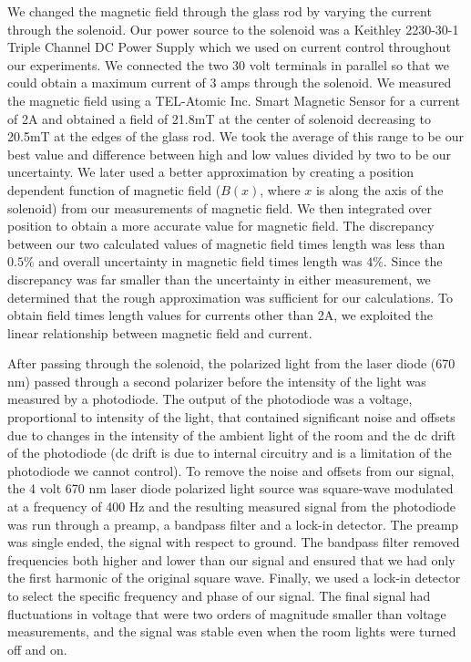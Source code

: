 \documentclass[prb,preprint]{revtex4-1}
\begin{document}
We changed the magnetic field through the glass rod by varying the current through the solenoid. Our power source to the solenoid was a Keithley 2230-30-1 Triple Channel DC Power Supply which we used on current control throughout our experiments. We connected the two 30 volt terminals in parallel so that we could obtain a maximum current of 3 amps through the solenoid. We measured the magnetic field using a TEL-Atomic Inc. Smart Magnetic Sensor for a current of 2A and obtained a field of 21.8mT at the center of solenoid decreasing to 20.5mT at the edges of the glass rod. We took the average of this range to be our best value and difference between high and low values divided by two to be our uncertainty. We later used a better approximation by creating a position dependent function of magnetic field ($B(x)$, where $x$ is along the axis of the solenoid) from our measurements of magnetic field. We then integrated over position to obtain a more accurate value for magnetic field. The discrepancy between our two calculated values of magnetic field times length was less than $0.5\%$ and overall uncertainty in magnetic field times length was $4\%$. Since the discrepancy was far smaller than the uncertainty in either measurement, we determined that the rough approximation was sufficient for our calculations. To obtain field times length values for currents other than 2A, we exploited the linear relationship between magnetic field and current.


After passing through the solenoid, the polarized light from the laser diode (670 nm) passed through a second polarizer before the intensity of the light was measured by a photodiode. The output of the photodiode was a voltage, proportional to intensity of the light, that contained significant noise and offsets due to changes in the intensity of the ambient light of the room and the dc drift of the photodiode (dc drift is due to internal circuitry and is a limitation of the photodiode we cannot control).  To remove the noise and offsets from our signal, the 4 volt 670 nm laser diode polarized light source was square-wave modulated at a frequency of 400 Hz and the resulting measured signal from the photodiode was run through a preamp, a bandpass filter and a lock-in detector. The preamp was single ended, the signal with respect to ground. The bandpass filter removed frequencies both higher and lower than our signal and ensured that we had only the first harmonic of the original square wave. Finally, we used a lock-in detector to select the specific frequency and phase of our signal. The final signal had fluctuations in voltage that were two orders of magnitude smaller than voltage measurements, and the signal was stable even when the room lights were turned off and on. 
\end{document}
